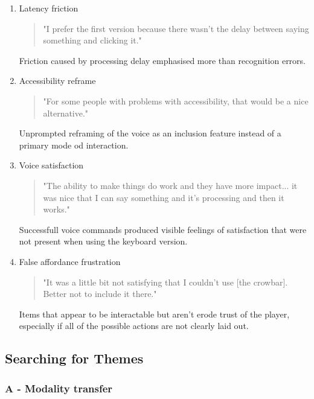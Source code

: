 \begin{enumerate}
          \item Latency friction
    
        \begin{quote}
            "I prefer the first version because there wasn't the delay between saying something and clicking it."
        \end{quote}
        Friction caused by processing delay emphasised more than recognition errors.


        \item Accessibility reframe 
    
        \begin{quote}
            "For some people with problems with accessibility, that would be a nice alternative." 
        \end{quote}
        Unprompted reframing of the voice as an inclusion feature instead of a primary mode od interaction.


        \item Voice satisfaction
    
        \begin{quote}
            "The ability to make things do work and they have more impact... it was nice that I can say something and it's processing and then it works."
        \end{quote}
        Successfull voice commands produced visible feelings of satisfaction that were not present when using the keyboard version.


        \item False affordance frustration
    
        \begin{quote}
            "It was a little bit not satisfying that I couldn't use [the crowbar]. Better not to include it there." 
        \end{quote}
        Items that appear to be interactable but aren't erode trust of the player, especially if all of the possible actions are not clearly laid out.
         

\end{enumerate}


\subsection{Searching for Themes}

\subsubsection{A - Modality transfer}


